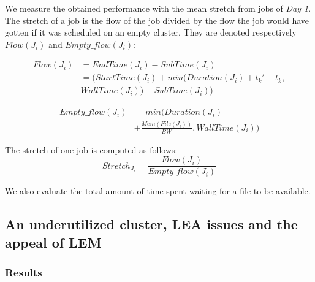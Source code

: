 \documentclass[conference,10pt]{IEEEtran}
\newcommand{\file}{\ensuremath{\mathit{File}}\xspace}
\newcommand{\memory}{\ensuremath{\mathit{Mem}}\xspace}
\newcommand{\duration}{\mathit{Duration}\xspace}
\newcommand{\bandwidth}{\mathit{BW}\xspace}
\newcommand{\submissiontime}{\mathit{SubTime}\xspace}
\newcommand{\Endtime}{\mathit{EndTime}\xspace}
\newcommand{\walltime}{\mathit{WallTime}\xspace}
\newcommand{\start}{\mathit{StartTime}\xspace}
\begin{document}
We measure the obtained performance with the mean
stretch from jobs of \textit{Day 1}.
The stretch of a job is the flow of the job divided
by the flow the job would have gotten if it was scheduled on an empty cluster.
They are denoted respectively $Flow(J_i)$ and $Empty\_flow(J_i)$:

\begin{equation}
\begin{split}
Flow(J_i) & = \Endtime(J_i) - \submissiontime(J_i) \\
& = (\start(J_i) + min(\duration(J_i) + t_k' - t_k, \\
& \walltime(J_i)) - \submissiontime(J_i))
\end{split}
\end{equation}

\begin{equation}
\begin{split}
Empty\_flow(J_i) & = min(\duration(J_i) \\
& + \frac{\memory(\file(J_i))}{\bandwidth}, \walltime(J_i))
\end{split}
\end{equation}

The stretch of one job is computed as follows:
\begin{equation}
Stretch_{J_i} = \frac{Flow(J_i)}{Empty\_flow(J_i)}
\end{equation}

We also evaluate the total amount of time spent waiting for a file to be available.

\subsection{An underutilized cluster, LEA issues and the appeal of LEM}

\subsubsection{Results}
\end{document}
